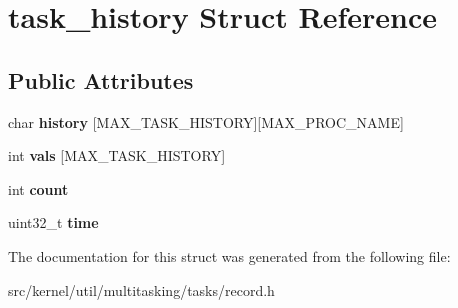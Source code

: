 \hypertarget{structtask__history}{}\section{task\+\_\+history Struct Reference}
\label{structtask__history}
\subsection*{Public Attributes}
\begin{DoxyCompactItemize}
\item 
\mbox{\label{structtask__history_a9d752e78631f75bd02b6d33aa755f90d}} 
char {\bfseries history} \mbox{[}M\+A\+X\+\_\+\+T\+A\+S\+K\+\_\+\+H\+I\+S\+T\+O\+RY\mbox{]}\mbox{[}M\+A\+X\+\_\+\+P\+R\+O\+C\+\_\+\+N\+A\+ME\mbox{]}
\item 
\mbox{\label{structtask__history_a46bc0a6051c7f30892cae0bafa3d9371}} 
int {\bfseries vals} \mbox{[}M\+A\+X\+\_\+\+T\+A\+S\+K\+\_\+\+H\+I\+S\+T\+O\+RY\mbox{]}
\item 
\mbox{\label{structtask__history_a994061d26a954cb64467bec5935c9383}} 
int {\bfseries count}
\item 
\mbox{\label{structtask__history_ad06a7a50026b3e0408789e06bc95408e}} 
uint32\+\_\+t {\bfseries time}
\end{DoxyCompactItemize}


The documentation for this struct was generated from the following file\+:\begin{DoxyCompactItemize}
\item 
src/kernel/util/multitasking/tasks/record.\+h\end{DoxyCompactItemize}
